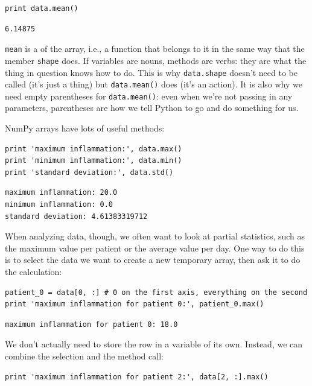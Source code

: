 \documentclass{book}
\begin{document}
\begin{verbatim}
print data.mean()
\end{verbatim}

\begin{verbatim}
6.14875
\end{verbatim}

\texttt{mean} is a  of the array, i.e., a
function that belongs to it in the same way that the member
\texttt{shape} does. If variables are nouns, methods are verbs: they are
what the thing in question knows how to do. This is why
\texttt{data.shape} doesn't need to be called (it's just a thing) but
\texttt{data.mean()} does (it's an action). It is also why we need empty
parentheses for \texttt{data.mean()}: even when we're not passing in any
parameters, parentheses are how we tell Python to go and do something
for us.

NumPy arrays have lots of useful methods:

\begin{verbatim}
print 'maximum inflammation:', data.max()
print 'minimum inflammation:', data.min()
print 'standard deviation:', data.std()
\end{verbatim}

\begin{verbatim}
maximum inflammation: 20.0
minimum inflammation: 0.0
standard deviation: 4.61383319712
\end{verbatim}

When analyzing data, though, we often want to look at partial
statistics, such as the maximum value per patient or the average value
per day. One way to do this is to select the data we want to create a
new temporary array, then ask it to do the calculation:

\begin{verbatim}
patient_0 = data[0, :] # 0 on the first axis, everything on the second
print 'maximum inflammation for patient 0:', patient_0.max()
\end{verbatim}

\begin{verbatim}
maximum inflammation for patient 0: 18.0
\end{verbatim}

We don't actually need to store the row in a variable of its own.
Instead, we can combine the selection and the method call:

\begin{verbatim}
print 'maximum inflammation for patient 2:', data[2, :].max()
\end{verbatim}
\end{document}
